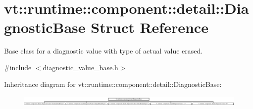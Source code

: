 \hypertarget{structvt_1_1runtime_1_1component_1_1detail_1_1_diagnostic_base}{}\section{vt\+:\+:runtime\+:\+:component\+:\+:detail\+:\+:Diagnostic\+Base Struct Reference}
\label{structvt_1_1runtime_1_1component_1_1detail_1_1_diagnostic_base}


Base class for a diagnostic value with type of actual value erased.  




{\ttfamily \#include $<$diagnostic\+\_\+value\+\_\+base.\+h$>$}

Inheritance diagram for vt\+:\+:runtime\+:\+:component\+:\+:detail\+:\+:Diagnostic\+Base\+:\begin{figure}[H]
\begin{center}
\leavevmode
\includegraphics[height=0.539759cm]{structvt_1_1runtime_1_1component_1_1detail_1_1_diagnostic_base}
\end{center}
\end{figure}
